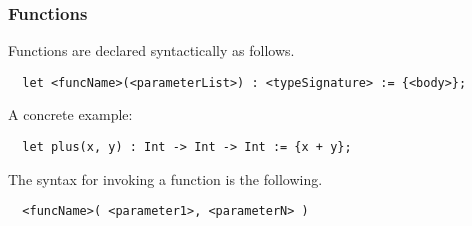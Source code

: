 \subsubsection{Functions}
\label{subsec:functions}

Functions are declared syntactically as follows.

\begin{verbatim}
  let <funcName>(<parameterList>) : <typeSignature> := {<body>};
\end{verbatim}

A concrete example:

\begin{verbatim}
  let plus(x, y) : Int -> Int -> Int := {x + y};
\end{verbatim}

The syntax for invoking a function is the following.

\begin{verbatim}
  <funcName>( <parameter1>, <parameterN> )
\end{verbatim}